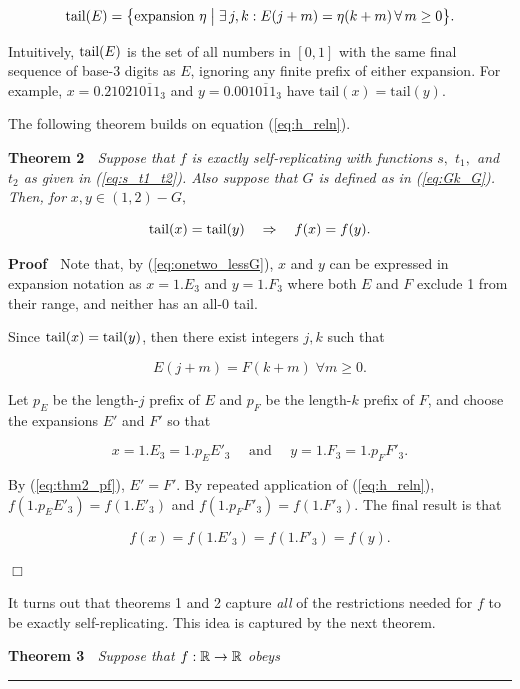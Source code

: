 \documentclass[]{article}
\begin{document}
\[\text{tail}(E) = \big\{\text{expansion }\eta \;\big|\;
\exists\, j, k: E(j + m) = \eta(k + m) \,\forall\, m \ge 0\big\}.\]

Intuitively, \(\text{tail}(E)\) is the set of all numbers in \([0, 1]\) with
the same final sequence of base-3 digits as \(E\), ignoring any finite
prefix of either expansion. For example, \(x=0.21021\overline{011}_3\)
and \(y=0.001\overline{011}_3\) have
\(\text{tail}(x) = \text{tail}(y)\).

The following theorem builds on equation (\ref{eq:h_reln}).

\textbf{Theorem 2} \(\;\) \emph{Suppose that \(f\) is exactly
self-replicating with functions \(s,\) \(t_1,\) and \(t_2\) as given in
(\ref{eq:s_t1_t2}). Also suppose that \(G\) is defined as in
(\ref{eq:Gk_G}). Then, for} \(x,y\in (1,2)-G,\)

\[\text{tail}(x) = \text{tail}(y) \quad\Rightarrow\quad f(x) = f(y).\]

\textbf{Proof} \(\;\) Note that, by (\ref{eq:onetwo_lessG}), \(x\) and
\(y\) can be expressed in expansion notation as \(x=1.E_3\) and
\(y=1.F_3\) where both \(E\) and \(F\) exclude 1 from their range, and
neither has an all-0 tail.

Since \(\text{tail}(x) = \text{tail}(y)\), then there exist integers \(j, k\) such
that

\begin{equation}E(j+m)=F(k+m)\; \forall m\ge 0.\label{eq:thm2_pf}\end{equation}

Let \(p_E\) be the length-\(j\) prefix of \(E\) and \(p_F\) be the
length-\(k\) prefix of \(F\), and choose the expansions \(E'\) and
\(F'\) so that

\[x = 1.E_3 = 1.p_EE'_3 \quad\text{ and }\quad y = 1.F_3 = 1.p_FF'_3.\]

By (\ref{eq:thm2_pf}), \(E'=F'\). By repeated application of
(\ref{eq:h_reln}), \(f(1.p_EE'_3) = f(1.E'_3)\) and
\(f(1.p_FF'_3) = f(1.F'_3)\). The final result is that

\[f(x) = f(1.E'_3) = f(1.F'_3) = f(y).\]

\hfill\(\Box\)

It turns out that theorems 1 and 2 capture \emph{all} of the
restrictions needed for \(f\) to be exactly self-replicating. This idea
is captured by the next theorem.

\textbf{Theorem 3} \(\;\) \emph{Suppose that \(f:\mathbb{R}\to\mathbb{R}\) obeys}

\begin{center}\rule{0.5\linewidth}{\linethickness}\end{center}
\end{document}
